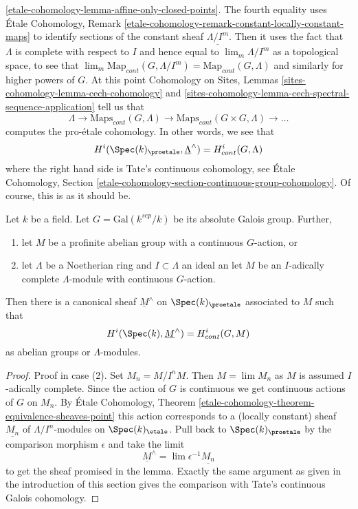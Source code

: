 \ref{etale-cohomology-lemma-affine-only-closed-points}.
The fourth equality uses
\'Etale Cohomology, Remark
\ref{etale-cohomology-remark-constant-locally-constant-maps}
to identify sections of the constant sheaf $\underline{\Lambda/I^m}$.
Then it uses the fact that $\Lambda$ is complete with respect to $I$
and hence equal to $\lim_m \Lambda/I^m$ as a topological space, to see that
$\lim_m \text{Map}_{cont}(G, \Lambda/I^m) = \text{Map}_{cont}(G, \Lambda)$
and similarly for higher powers of $G$.
At this point Cohomology on Sites, Lemmas
\ref{sites-cohomology-lemma-cech-cohomology}  and
\ref{sites-cohomology-lemma-cech-spectral-sequence-application}
tell us that
$$
\Lambda \to \text{Maps}_{cont}(G, \Lambda) \to
\text{Maps}_{cont}(G \times G, \Lambda) \to \ldots
$$
computes the pro-\'etale cohomology. In other words, we see that
$$
H^i(\Spec(k)_\proetale, \underline{\Lambda}^\wedge)
=
H^i_{cont}(G, \Lambda)
$$
where the right hand side is Tate's continuous cohomology, see
\'Etale Cohomology, Section
\ref{etale-cohomology-section-continuous-group-cohomology}.
Of course, this is as it should be.

\begin{lemma}
\label{lemma-more-general-point}
Let $k$ be a field. Let $G = \text{Gal}(k^{sep}/k)$ be its absolute
Galois group. Further, 
\begin{enumerate}
\item let $M$ be a profinite abelian group with a continuous
$G$-action, or
\item let $\Lambda$ be a Noetherian ring and $I \subset \Lambda$ an ideal
an let $M$ be an $I$-adically complete $\Lambda$-module with continuous
$G$-action.
\end{enumerate}
Then there is a canonical sheaf $\underline{M}^\wedge$ on
$\Spec(k)_\proetale$ associated to $M$ such that
$$
H^i(\Spec(k), \underline{M}^\wedge) = H^i_{cont}(G, M)
$$
as abelian groups or $\Lambda$-modules.
\end{lemma}

\begin{proof}
Proof in case (2). Set $M_n = M/I^nM$. Then $M = \lim M_n$ as $M$ is
assumed $I$-adically complete. Since the action of $G$ is continuous
we get continuous actions of $G$ on $M_n$. By \'Etale Cohomology, Theorem
\ref{etale-cohomology-theorem-equivalence-sheaves-point}
this action corresponds to a (locally constant) sheaf
$\underline{M_n}$ of $\Lambda/I^n$-modules on $\Spec(k)_\etale$.
Pull back to $\Spec(k)_\proetale$ by the comparison morphism
$\epsilon$ and take the limit
$$
\underline{M}^\wedge = \lim \epsilon^{-1}\underline{M_n}
$$
to get the sheaf promised in the lemma. Exactly the same argument as
given in the introduction of this section gives the comparison
with Tate's continuous Galois cohomology.
\end{proof}






